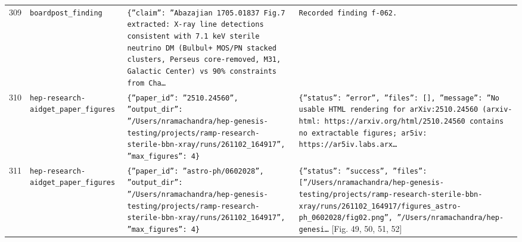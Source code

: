 \documentclass[11pt,a4paper]{article}
\begin{document}
\begin{longtable}{@{}p{}p{}p{}p{}@{}}
309 & \texttt{board}\newline\texttt{post\_\allowbreak{}finding} & \texttt{\{''claim'':\allowbreak{} ''Abazajian 1705.01837 Fig.7 extracted:\allowbreak{} X-ray line detections consistent with 7.1 keV sterile neutrino DM (Bulbul+ MOS/\allowbreak{}PN stacked clusters,\allowbreak{} Perseus core-removed,\allowbreak{} M31,\allowbreak{} Galactic Center)\allowbreak{} vs 90\% constraints from Cha\ldots{}\allowbreak{}} & \texttt{Recorded finding f-062.} \\
310 & \texttt{hep-research-aid}\newline\texttt{get\_\allowbreak{}paper\_\allowbreak{}figures} & \texttt{\{''paper\_\allowbreak{}id'':\allowbreak{} ''2510.24560'',\allowbreak{} ''output\_\allowbreak{}dir'':\allowbreak{} ''/\allowbreak{}Users/\allowbreak{}nramachandra/\allowbreak{}hep-genesis-testing/\allowbreak{}projects/\allowbreak{}ramp-research-sterile-bbn-xray/\allowbreak{}runs/\allowbreak{}261102\_\allowbreak{}164917'',\allowbreak{} ''max\_\allowbreak{}figures'':\allowbreak{} 4\}\allowbreak{}} & \texttt{\{''status'':\allowbreak{} ''error'',\allowbreak{} ''files'':\allowbreak{} []\allowbreak{},\allowbreak{} ''message'':\allowbreak{} ''No usable HTML rendering for arXiv:\allowbreak{}2510.24560 (arxiv-html:\allowbreak{} https:\allowbreak{}/\allowbreak{}/\allowbreak{}arxiv.org/\allowbreak{}html/\allowbreak{}2510.24560 contains no extractable figures;\allowbreak{} ar5iv:\allowbreak{} https:\allowbreak{}/\allowbreak{}/\allowbreak{}ar5iv.labs.arx\ldots{}\allowbreak{}} \\
311 & \texttt{hep-research-aid}\newline\texttt{get\_\allowbreak{}paper\_\allowbreak{}figures} & \texttt{\{''paper\_\allowbreak{}id'':\allowbreak{} ''astro-ph/\allowbreak{}0602028'',\allowbreak{} ''output\_\allowbreak{}dir'':\allowbreak{} ''/\allowbreak{}Users/\allowbreak{}nramachandra/\allowbreak{}hep-genesis-testing/\allowbreak{}projects/\allowbreak{}ramp-research-sterile-bbn-xray/\allowbreak{}runs/\allowbreak{}261102\_\allowbreak{}164917'',\allowbreak{} ''max\_\allowbreak{}figures'':\allowbreak{} 4\}\allowbreak{}} & \texttt{\{''status'':\allowbreak{} ''success'',\allowbreak{} ''files'':\allowbreak{} [''/\allowbreak{}Users/\allowbreak{}nramachandra/\allowbreak{}hep-genesis-testing/\allowbreak{}projects/\allowbreak{}ramp-research-sterile-bbn-xray/\allowbreak{}runs/\allowbreak{}261102\_\allowbreak{}164917/\allowbreak{}figures\_\allowbreak{}astro-ph\_\allowbreak{}0602028/\allowbreak{}fig02.png'',\allowbreak{} ''/\allowbreak{}Users/\allowbreak{}nramachandra/\allowbreak{}hep-genesi\ldots{}\allowbreak{}} [Fig. 49, 50, 51, 52] \\

\end{longtable}
\end{document}
